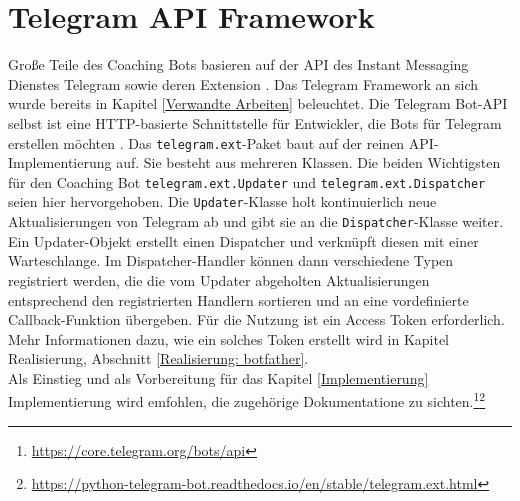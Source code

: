     \section{Telegram API Framework}
        Große Teile des Coaching Bots basieren auf der API des Instant Messaging Dienstes Telegram\cite{telegramAPI} sowie deren Extension \cite{telegramAPIext}. Das Telegram Framework an sich wurde bereits in Kapitel \ref*{Verwandte Arbeiten} beleuchtet. Die Telegram Bot-API selbst ist eine HTTP-basierte Schnittstelle für Entwickler, die Bots für Telegram erstellen möchten \cite{core_telegram_api}. Das \verb|telegram.ext|-Paket baut auf der reinen API-Implementierung auf. Sie besteht aus mehreren Klassen. Die beiden Wichtigsten für den Coaching Bot \verb|telegram.ext.Updater| und \verb|telegram.ext.Dispatcher| seien hier hervorgehoben. Die \verb|Updater|-Klasse holt kontinuierlich neue Aktualisierungen von Telegram ab und gibt sie an die \verb|Dispatcher|-Klasse weiter. Ein Updater-Objekt erstellt einen Dispatcher und verknüpft diesen mit einer Warteschlange. Im Dispatcher-Handler können dann verschiedene Typen registriert werden, die die vom Updater abgeholten Aktualisierungen entsprechend den registrierten Handlern sortieren und an eine vordefinierte Callback-Funktion übergeben. Für die Nutzung ist ein Access Token erforderlich.\cite{telegram_ext_intro} Mehr Informationen dazu, wie ein solches Token erstellt wird in Kapitel Realisierung, Abschnitt \ref{Realisierung: botfather}.\\
        Als Einstieg und als Vorbereitung für das Kapitel \ref*{Implementierung} Implementierung wird emfohlen, die zugehörige Dokumentatione zu sichten.\footnote{\url{https://core.telegram.org/bots/api}}\footnote{\url{https://python-telegram-bot.readthedocs.io/en/stable/telegram.ext.html}}


